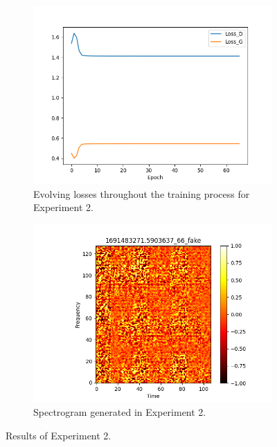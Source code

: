 \begin{figure}[!ht]
    \centering
    \begin{subfigure}{0.45\textwidth}
        \includegraphics[width=\textwidth]{figures/4.5-results/exp2_loss.png}
        \caption{Evolving losses throughout the training process for Experiment 2.}
        \label{fig:exp2_loss}
    \end{subfigure}
    \begin{subfigure}{0.45\textwidth}
        \includegraphics[width=\textwidth]{figures/4.5-results/exp2_spectrogram.png}
        \caption{Spectrogram generated in Experiment 2.}
        \label{fig:exp2_spectrogram}
    \end{subfigure}
    \caption{Results of Experiment 2.}
    \label{fig:exp2_results}
\end{figure}